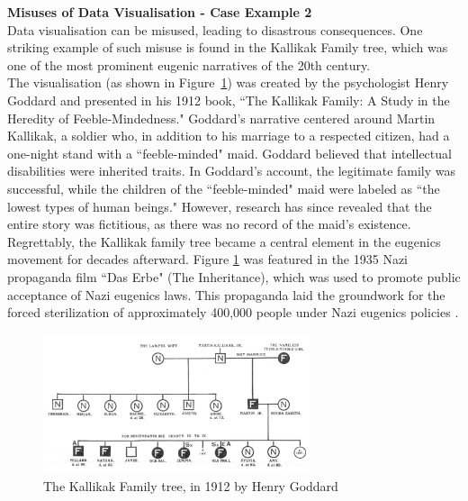 \documentclass{article}\usepackage[]{graphicx}\usepackage[]{xcolor}
\begin{document}
\noindent 
\textbf{Misuses of Data Visualisation - Case Example 2}\\

\noindent
Data visualisation can be misused, leading to disastrous consequences. One striking example of such misuse is found in the Kallikak Family tree, which was one of the most prominent eugenic narratives of the 20th century.\\

\noindent
The visualisation (as shown in Figure~\ref{fig:familytree}) was created by the psychologist Henry Goddard and presented in his 1912 book, ``The Kallikak Family: A Study in the Heredity of Feeble-Mindedness." Goddard's narrative centered around Martin Kallikak, a soldier who, in addition to his marriage to a respected citizen, had a one-night stand with a ``feeble-minded" maid. Goddard believed that intellectual disabilities were inherited traits. In Goddard's account, the legitimate family was successful, while the children of the ``feeble-minded" maid were labeled as ``the lowest types of human beings." However, research has since revealed that the entire story was fictitious, as there was no record of the maid's existence\cite{fakedata}.\\

\noindent
Regrettably, the Kallikak family tree became a central element in the eugenics movement for decades afterward. Figure \ref{fig:familytree} was featured in the 1935 Nazi propaganda film ``Das Erbe" (The Inheritance), which was used to promote public acceptance of Nazi eugenics laws. This propaganda laid the groundwork for the forced sterilization of approximately 400,000 people under Nazi eugenics policies \cite{eugenics}.

\begin{figure}[H]
    \centering
    \includegraphics[width=0.7\textwidth]{image_reference/familytree.jpg}
    \caption{The Kallikak Family tree, in 1912 by Henry Goddard\cite{ktree}}
    \label{fig:familytree}
\end{figure}
\end{document}
